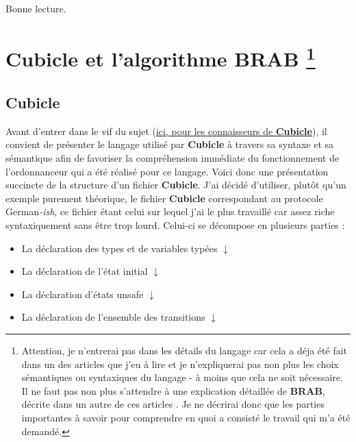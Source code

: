 \documentclass{memoir}
\begin{document}
	\paragraph{}Bonne lecture.
	
	

	\chapter[Cubicle et l'algorithme BRAB]{Cubicle et l'algorithme BRAB \footnote{Attention, je n'entrerai pas dans les détails du langage car cela a déja été fait dans un des articles que j’eu à lire \cite{Verif} et je n'expliquerai pas non plus les choix sémantiques ou syntaxiques du langage - à moins que cela ne soit nécessaire. Il ne faut pas non plus s'attendre à une explication détaillée de \textbf{BRAB}, décrite dans un autre de ces articles \cite{BRAB}. Je ne décrirai donc que les parties importantes à savoir pour comprendre en quoi a consisté le travail qui m'a été demandé.}}
	\label{chap:cubibrab}
		
		\section{Cubicle}
		\label{sec:cubi}
		
		Avant d'entrer dans le vif du sujet (\hyperref[vif:vif_du_sujet]{ici, pour les connaisseurs de \textbf{Cubicle}}), il convient de présenter le langage utilisé par \textbf{Cubicle} à travers sa syntaxe et sa sémantique afin de favoriser la compréhension immédiate du fonctionnement de l'ordonnanceur qui a été réalisé pour ce langage. Voici donc une présentation succincte de la structure d'un fichier \textbf{Cubicle}. J'ai décidé d'utiliser, plutôt qu'un exemple purement théorique, le fichier \textbf{Cubicle} correspondant au protocole German\textit{-ish}, ce fichier étant celui sur lequel j'ai le plus travaillé car assez riche syntaxiquement sans être trop lourd. Celui-ci se décompose en plusieurs parties :
		\begin{itemize}
			\item La déclaration des types et de variables typées 
				\hyperref[subsec:decl_types]{$\downarrow$}
			\item La déclaration de l'état initial 
				\hyperref[subsec:decl_init]{$\downarrow$}
			\item La déclaration d'états unsafe 
				\hyperref[subsec:decl_unsafe]{$\downarrow$}
			\item La déclaration de l'ensemble des transitions 
				\hyperref[subsec:decl_trans]{$\downarrow$}
		\end{itemize}
		
\end{document}
